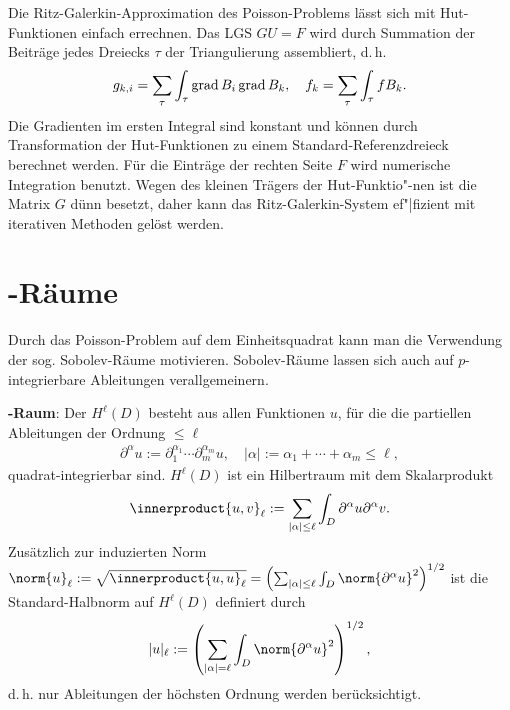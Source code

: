 \linie

Die Ritz-Galerkin-Approximation des Poisson-Problems lässt sich mit Hut-Funktionen einfach
errechnen.
Das LGS $GU = F$ wird durch Summation der Beiträge jedes Dreiecks $\tau$ der Triangulierung
assembliert, d.\,h.
\begin{align*}
    g_{k,i} = \sum_\tau \int_\tau \operatorname{grad} B_i \operatorname{grad} B_k,\quad
    f_k = \sum_\tau \int_\tau f B_k.
\end{align*}
Die Gradienten im ersten Integral sind konstant und können durch Transformation der Hut-Funktionen
zu einem Standard-Referenzdreieck berechnet werden.
Für die Einträge der rechten Seite $F$ wird numerische Integration benutzt.
Wegen des kleinen Trägers der Hut-Funktio"-nen ist die Matrix $G$ dünn besetzt,
daher kann das Ritz-Galerkin-System ef"|fizient mit iterativen Methoden gelöst werden.

\pagebreak

\section{%
    -Räume%
}

Durch das Poisson-Problem auf dem Einheitsquadrat kann man die Verwendung der sog.
Sobolev-Räume motivieren.
Sobolev-Räume lassen sich auch auf $p$-integrierbare Ableitungen verallgemeinern.

\textbf{-Raum}:
Der  $H^\ell(D)$ besteht aus allen Funktionen $u$, für die die
partiellen Ableitungen der Ordnung $\le \ell$
\begin{align*}
    \partial^\alpha u := \partial_1^{\alpha_1} \dotsm \partial_m^{\alpha_m} u,\quad
    |\alpha| := \alpha_1 + \dotsb + \alpha_m \le \ell,
\end{align*}
quadrat-integrierbar sind.
$H^\ell(D)$ ist ein Hilbertraum mit dem Skalarprodukt
\begin{align*}
    \innerproduct{u, v}_\ell := \sum_{|\alpha| \le \ell} \int_D \partial^\alpha u \partial^\alpha v.
\end{align*}
Zusätzlich zur induzierten Norm
$\norm{u}_\ell := \sqrt{\innerproduct{u, u}_\ell} =
\left(\sum_{|\alpha| \le \ell} \int_D \norm{\partial^\alpha u}^2\right)^{1/2}$ ist die
Standard-Halbnorm auf $H^\ell(D)$ definiert durch
\begin{align*}
    |u|_\ell := \left(\sum_{|\alpha| = \ell} \int_D \norm{\partial^\alpha u}^2\right)^{1/2},
\end{align*}
d.\,h. nur Ableitungen der höchsten Ordnung werden berücksichtigt.

